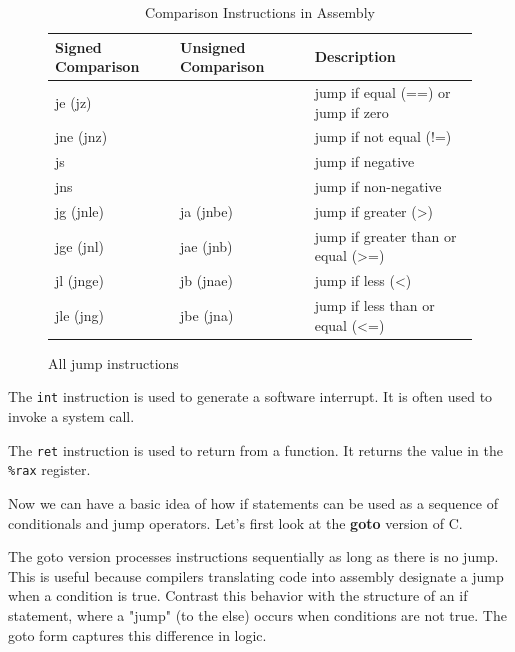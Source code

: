 \documentclass{article}
\begin{document}
\begin{definition}[Jump]
        \begin{figure}[H]
          \centering 
          \begin{table}[H]
            \centering
            \begin{tabular}{|l|l|l|}
            \hline
            \textbf{Signed Comparison} & \textbf{Unsigned Comparison} & \textbf{Description} \\ \hline
            je (jz) & & jump if equal (==) or jump if zero \\ \hline
            jne (jnz) & & jump if not equal (!=) \\ \hline
            js & & jump if negative \\ \hline
            jns & & jump if non-negative \\ \hline
            jg (jnle) & ja (jnbe) & jump if greater (>) \\ \hline
            jge (jnl) & jae (jnb) & jump if greater than or equal (>=) \\ \hline
            jl (jnge) & jb (jnae) & jump if less (<) \\ \hline
            jle (jng) & jbe (jna) & jump if less than or equal (<=) \\ \hline
            \end{tabular}
            \caption{Comparison Instructions in Assembly}
            \label{table:comparison_instructions}
          \end{table}
          \caption{All jump instructions} 
          \label{fig:jump_instructions_all}
        \end{figure}
      \end{definition}

      \begin{definition}[int]
        The \texttt{int} instruction is used to generate a software interrupt. It is often used to invoke a system call.
      \end{definition}

      \begin{definition}[ret]
        The \texttt{ret} instruction is used to return from a function. It returns the value in the \texttt{\%rax} register. 
      \end{definition}

      Now we can have a basic idea of how if statements can be used as a sequence of conditionals and jump operators. Let's first look at the \textbf{goto} version of C. 

      \begin{definition}
        The goto version processes instructions sequentially as long as there is no jump. This is useful because compilers translating code into assembly designate a jump when a condition is true. Contrast this behavior with the structure of an if statement, where a "jump" (to the else) occurs when conditions are not true. The goto form captures this difference in logic.
      \end{definition}
\end{document}
